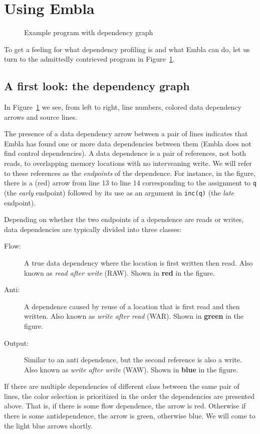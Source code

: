 %

\section{Using Embla}

\begin{figure} 
\small

\caption{Example program with dependency graph} \label{ffirstex}
\end{figure}

To get a feeling for what dependency profiling is and what Embla can do, 
let us turn to the admittedly contrieved program in Figure~\ref{ffirstex}. 

\subsection{A first look: the dependency graph}

In Figure~\ref{ffirstex} we see, from 
left to right, line numbers, colored data dependency arrows and source 
lines. 

The presence of a data dependency arrow between a pair of lines indicates
that Embla has found one or more data dependencies between them
(Embla does not find control dependencies). A data dependence is a pair
of references, not both reads, to overlapping memory
locations with no interveaning write. We will refer to these
references as the {\em endpoints} of the dependence.
For instance, in the figure, 
there is a (red) arrow from line 13 to line 14 corresponding to
the assignment to {\tt q} (the {\em early} endpoint) followed by its use 
as an argument in {\tt inc(q)} (the {\em late} endpoint).

Depending on whether the two endpoints of a dependence
are reads or writes, data dependencies are typically divided into 
three classes:
\begin{description}
\item[Flow:]
A true data dependency where the location is first written then
read. Also known as {\em read after write} (RAW). Shown in 
{\bf \color{red} red} in the figure.
\item[Anti:]
A dependence caused by reuse of a location that is first read and then
written. Also known as {\em write after read} (WAR). Shown in 
{\bf \color{green} green} in the figure.
\item[Output:]
Similar to an anti dependence, but the second reference is also a
write. Also known as {\em write after write} (WAW). Shown in 
{\bf \color{blue} blue} in the figure.
\end{description}
If there are multiple dependencies of different class between the 
same pair of lines, the color selection is prioritized in the
order the dependencies are presented above. That is, if there is
some flow dependence, the arrow is red. Otherwise if there is 
some antidependence, the arrow is green, otherwise blue. We will 
come to the light blue arrows shortly.


